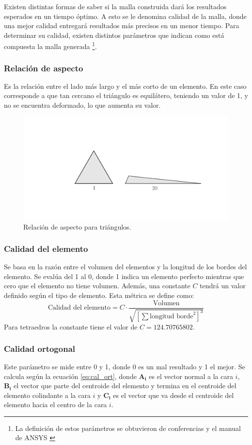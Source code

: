 Existen distintas formas de saber si la malla construida dará los resultados esperados en un tiempo óptimo. A esto se le denomina calidad de la malla, donde una mejor calidad entregará resultados más precisos en un menor tiempo. Para determinar su calidad, existen distintos parámetros que indican como está compuesta la malla generada \footnote{La definición de estos parámetros se obtuvieron de conferencias y el manual de ANSYS \cite{sharcnet_2017}\cite{ansys_2015}}.

\subsubsection{Relación de aspecto}
Es la relación entre el lado más largo y el más corto de un elemento. En este caso corresponde a que tan cercano el triángulo es equilátero, teniendo un valor de 1, y no se encuentra deformado, lo que aumenta su valor. 

\begin{figure}[h]
\centering
\includegraphics[width=0.5\linewidth, trim={12cm 7cm 6.5cm 7.5cm}, clip]{Imagenes/asp_ratio.pdf}
\caption{Relación de aspecto para triángulos.}
\label{fig:asp_ratio}
\end{figure}

\subsubsection{Calidad del elemento}
Se basa en la razón entre el volumen del elementos y la longitud de los bordes del elemento. Se evalúa del 1 al 0, donde 1 indica un elemento perfecto mientras que cero que el elemento no tiene volumen. Además, una constante $C$ tendrá un valor definido según el tipo de elemento. Esta métrica se define como:
\begin{equation}
	\text{Calidad del elemento} = C \cdot \frac{\text{Volumen}}{\sqrt{\left[\sum \text{longitud borde}^2\right]^3}}
\end{equation}
Para tetraedros la constante tiene el valor de $C=124.70765802$.

\subsubsection{Calidad ortogonal}
Este parámetro se mide entre 0 y 1, donde 0 es un mal resultado y 1 el mejor. Se calcula según la ecuación \ref{eq:cal_ort}, donde $\mathbf{A_i}$ es el vector normal a la cara $i$, $\mathbf{B_i}$ el vector que parte del centroide del elemento y termina en el centroide del elemento colindante a la cara $i$ y $\mathbf{C_i}$ es el vector que va desde el centroide del elemento hacia el centro de la cara $i$.

